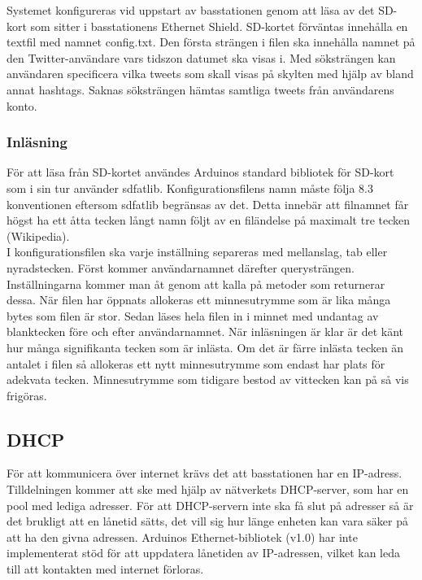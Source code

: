 \documentclass[a4paper,11pt]{article}
\begin{document}
Systemet konfigureras vid uppstart av basstationen genom att läsa av det SD-kort som sitter i basstationens Ethernet Shield. SD-kortet förväntas innehålla en textfil med namnet config.txt. Den första strängen i filen ska innehålla namnet på den Twitter-användare vars tidszon datumet ska visas i. Med söksträngen kan användaren specificera vilka tweets som skall visas på skylten med hjälp av bland annat hashtags. Saknas söksträngen hämtas samtliga tweets från användarens konto.

\subsubsection{Inläsning}
För att läsa från SD-kortet användes Arduinos standard bibliotek för SD-kort som i sin tur använder sdfatlib. Konfigurationsfilens namn måste följa 8.3 konventionen eftersom sdfatlib begränsas av det. Detta innebär att filnamnet får högst ha ett åtta tecken långt namn följt av en filändelse på maximalt tre tecken (Wikipedia). \\

I konfigurationsfilen ska varje inställning separeras med mellanslag, tab eller nyradstecken. Först kommer användarnamnet därefter querysträngen. Inställningarna kommer man åt genom att kalla på metoder som returnerar dessa. När filen har öppnats allokeras ett minnesutrymme som är lika många bytes som filen är stor. Sedan läses hela filen in i minnet med undantag av blanktecken före och efter användarnamnet. När inläsningen är klar är det känt hur många signifikanta tecken som är inlästa. Om det är färre inlästa tecken än antalet i filen så allokeras ett nytt minnesutrymme som endast har plats för adekvata tecken. Minnesutrymme som tidigare bestod av vittecken kan på så vis frigöras.

\subsection{DHCP}
För att kommunicera över internet krävs det att basstationen har en IP-adress. Tilldelningen kommer att ske med hjälp av nätverkets DHCP-server, som har en pool med lediga adresser. För att DHCP-servern inte ska få slut på adresser så är det brukligt att en lånetid sätts, det vill sig hur länge enheten kan vara säker på att ha den givna adressen. Arduinos Ethernet-bibliotek (v1.0) har inte implementerat stöd för att uppdatera lånetiden av IP-adressen, vilket kan leda till att kontakten med internet förloras. \\
\end{document}
